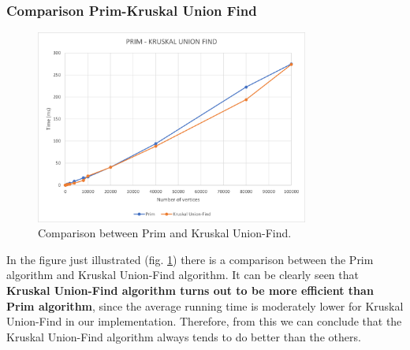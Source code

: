 \subsubsection{Comparison Prim-Kruskal Union Find}
\begin{figure}[H]
    \centering
    \includegraphics[width=0.8\textwidth]{../img/ComparisonPrimKruskal.png}
    \caption{Comparison between Prim and Kruskal Union-Find.}
    \label{fig:comparison}
\end{figure}
In the figure just illustrated (fig. \ref{fig:comparison}) there is a comparison between the Prim algorithm 
and Kruskal Union-Find algorithm. It can be clearly seen that \textbf{Kruskal Union-Find algorithm turns out to be more 
efficient than Prim algorithm}, since the average running time is moderately lower for Kruskal Union-Find 
in our implementation. Therefore, from this we can conclude that the Kruskal Union-Find algorithm always tends to do 
better than the others.